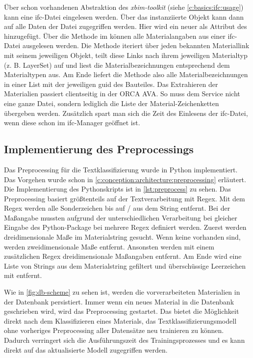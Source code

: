 Über schon vorhandenen Abstraktion des \textit{xbim-toolkit} (siehe \autoref{c:basics:ifc:usage}) kann eine \ac{ifc}-Datei eingelesen werden. Über das instanziierte Objekt  kann dann auf alle Daten der Datei zugegriffen werden. Hier wird ein neuer  als Attribut des  hinzugefügt. Über die Methode  im  können alle Materialangaben aus einer \ac{ifc}-Datei ausgelesen werden. Die Methode iteriert über jeden bekannten Materiallink mit seinem jeweiligen Objekt, teilt diese Links nach ihrem jeweiligen Materialtyp (z. B. LayerSet) auf und liest die Materialbezeichnungen entsprechend dem Materialtypen aus. Am Ende liefert die Methode also alle Materialbezeichnungen in einer List mit der jeweiligen \ac{guid} des Bauteiles.
Das Extrahieren der Materialien passiert clientseitig in der ORCA AVA. So muss dem Service nicht eine ganze Datei, sondern lediglich die Liste der Material-Zeichenketten übergeben werden. Zusätzlich spart man sich die Zeit des Einlesens der \ac{ifc}-Datei, wenn diese schon im \ac{ifc}-Manager geöffnet ist.

\subsection{Implementierung des Preprocessings}
\label{c:implementation:preprocess}
Das Preprocessing für die Textklassifizierung wurde in Python implementiert.
Das Vorgehen wurde schon in \autoref{c:conception:architecture:preprocessing} erläutert. Die Implementierung des Pythonskripts ist in \autoref{lst:preprocess} zu sehen. Das Preprocessing basiert größtenteils auf der Textverarbeitung mit Regex. Mit dem Regex \code{[A-Za-z0-9üäöÜÄÖßóåéèÉÈÓ/]} werden alle Sonderzeichen bis auf  \glqq /\grqq{} aus dem String entfernt. Bei der Maßangabe mussten aufgrund der unterschiedlichen Verarbeitung bei gleicher Eingabe des Python-Package  bei   mehrere Regex definiert werden. Zuerst werden dreidimensionale Maße im Materialstring gesucht. Wenn keine vorhanden sind, werden zweidimensionale Maße entfernt. Ansonsten werden mit einem zusätzlichen Regex dreidimensionale Maßangaben entfernt. Am Ende wird eine Liste von Strings aus dem Materialstring gefiltert und überschüssige Leerzeichen mit  entfernt. 

Wie in \autoref{fig:db-scheme} zu sehen ist, werden die vorverarbeiteten Materialien in der Datenbank persistiert. Immer wenn ein neues Material in die Datenbank geschrieben wird, wird das Preprocessing gestartet. Das bietet die Möglichkeit direkt nach dem Klassifizieren eines Materials, das Textklassifizierungsmodell ohne vorheriges Preprocessing aller Datensätze neu trainieren zu können. Dadurch verringert sich die Ausführungszeit des Trainingsprozesses und es kann direkt auf das aktualisierte Modell zugegriffen werden.

